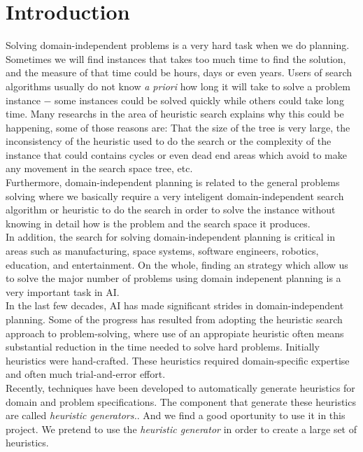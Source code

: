 \documentclass[11pt,a4paper,oneside]{report}
\begin{document}
\tableofcontents
\newpage

\section{Introduction}
Solving domain-independent problems is a very hard task when we do planning. Sometimes we will find instances that takes too much time to find the solution, and the measure of that time could be hours, days or even years. Users of search algorithms usually do not know \textit{a priori} how long it will take to solve a problem instance $-$ some instances could be solved quickly while others could take long time. Many researchs in the area of heuristic search explains why this could be happening, some of those reasons are: That the size of the tree is very large, the inconsistency of the heuristic used to do the search or the complexity of the instance that could contains cycles or even dead end areas which avoid to make any movement in the search space tree, etc.\\

Furthermore, domain-independent planning is related to the general problems solving where we basically require a very inteligent domain-independent search algorithm or heuristic to do the search in order to solve the instance without knowing in detail how is the problem and the search space it produces.\\

 In addition, the search for solving domain-independent planning is critical in areas such as manufacturing, space systems, software engineers, robotics, education, and entertainment. On the whole, finding an strategy which allow us to solve the major number of problems using domain indepenent planning is a very important task in AI.\\

In the last few decades, AI has made significant strides in domain-independent planning. Some of the progress has resulted from adopting the heuristic search approach to problem-solving, where use of an appropiate heuristic often means substantial reduction in the time needed to solve hard problems. Initially heuristics were hand-crafted. These heuristics required domain-specific expertise and often much trial-and-error effort.\\

Recently, techniques have been developed to automatically generate heuristics for domain and problem specifications. The component that generate these heuristics are called \textit{heuristic generators.}. And we find a good oportunity to use it in this project. We pretend to use the \textit{heuristic generator} in order to create a large set of heuristics.\\
\end{document}
